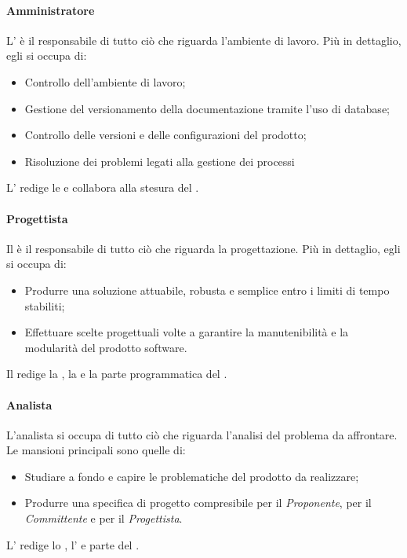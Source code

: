 \paragraph{Amministratore}
L'\textsl{\Amm} è il responsabile di tutto ciò che riguarda l'ambiente di 
lavoro. Più in dettaglio, egli si occupa di:
\begin{itemize}
  \item Controllo dell'ambiente di lavoro;
  \item Gestione del versionamento della documentazione tramite l'uso di 
  database;
  \item Controllo delle versioni e delle configurazioni del prodotto;
  \item Risoluzione dei problemi legati alla gestione dei processi
\end{itemize}
L'\textsl{\Amm} redige le \textsl{\NdP} e collabora alla stesura del 
\textsl{\PdP}.

\paragraph{Progettista}
Il \textsl{\Prog} è il responsabile di tutto ciò che riguarda la progettazione. 
Più in dettaglio, egli si occupa di:
\begin{itemize}
  \item Produrre una soluzione attuabile, robusta e semplice entro i limiti di 
  tempo stabiliti;
  \item Effettuare scelte progettuali volte a garantire la manutenibilità e la 
  modularità del prodotto software.
\end{itemize}
Il \textsl{\Prog} redige la \textsl{\ST}, la \textsl{\DDP} e la parte 
programmatica del \textsl{\PdQ}.

\paragraph{Analista}
L'analista si occupa di tutto ciò che riguarda l'analisi del problema da 
affrontare. Le mansioni principali sono quelle di:
\begin{itemize}
  \item Studiare a fondo e capire le problematiche del prodotto da realizzare;
  \item Produrre una specifica di progetto compresibile per il 
  \textsl{Proponente}, per il \textsl{Committente} e per il 
  \textsl{Progettista}.
\end{itemize}
L'\textsl{\Ana} redige lo \textsl{\SdF}, l'\textsl{\AdR} e parte del 
\textsl{\PdQ}.

